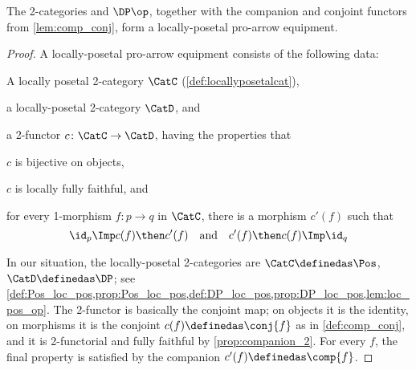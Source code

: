 \begin{theorem}
  The 2-categories \Pos and $\DP\op$, together with the companion and conjoint functors from \cref{lem:comp_conj}, form a locally-posetal pro-arrow equipment.
\end{theorem}
\begin{proof}
  A locally-posetal pro-arrow equipment consists of the following data:
  \begin{compactitem}
    \item A locally posetal 2-category $\CatC$ (\cref{def:locallyposetalcat}),
    \item a locally-posetal 2-category $\CatD$, and
    \item a 2-functor $c\colon\CatC\to\CatD$, having the properties that
    \begin{compactitem}
      \item $c$ is bijective on objects,
      \item $c$ is locally fully faithful, and
      \item for every 1-morphism $f\colon p\to q$ in $\CatC$, there is a morphism $c'(f)$ such that
      \begin{equation}
        \id_p\Imp c(f)\then c'(f)\quad\text{and}\quad c'(f)\then c(f)\Imp\id_q
      \end{equation}
    \end{compactitem}
  \end{compactitem}
  In our situation, the locally-posetal 2-categories are $\CatC\definedas\Pos$, $\CatD\definedas\DP$; see \cref{def:Pos_loc_pos,prop:Pos_loc_pos,def:DP_loc_pos,prop:DP_loc_pos,lem:loc_pos_op}. The 2-functor is basically the conjoint map; on objects it is the identity, on morphisms it is the conjoint $c(f)\definedas\conj{f}$ as in \cref{def:comp_conj}, and it is 2-functorial and fully faithful by \cref{prop:companion_2}. For every $f$, the final property is satisfied by the companion $c'(f)\definedas \comp{f}$.
\end{proof}

